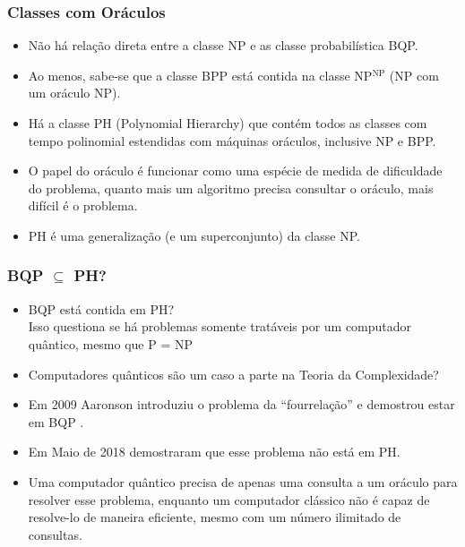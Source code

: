 \documentclass{beamer}
\begin{document}
\begin{frame}
\frametitle{Classes com Oráculos} 
\begin{itemize}
  \item Não há relação direta entre a classe NP e
  as classe probabilística BQP.
  \item Ao menos, sabe-se que a classe BPP está contida na classe
  NP$^{\text{NP}}$ (NP com um oráculo NP).
  \item Há a classe PH (Polynomial Hierarchy) que contém todos as
  classes com tempo polinomial estendidas com máquinas oráculos,
  inclusive NP e BPP.
  \item O papel do oráculo é funcionar como uma espécie de
  medida de dificuldade do problema, quanto mais um algoritmo precisa
  consultar o oráculo, mais difícil é o problema.
  \item PH é uma generalização (e um superconjunto) da classe NP. 
\end{itemize}
\end{frame}

\begin{frame}
\frametitle{BQP $\subseteq$ PH?} 
\begin{itemize}
  \item BQP está contida em PH?\\
   Isso questiona se há problemas somente tratáveis por um
   computador quântico, mesmo que P = NP
  \item Computadores quânticos são um caso a parte na Teoria da
   Complexidade?
  \item Em 2009 Aaronson introduziu o problema da ``fourrelação'' e
   demostrou estar em BQP \cite{aa:09}.
  \item Em Maio de 2018 \cite{ra:18} demostraram que esse problema não
   está em PH.
  \item Uma computador quântico precisa de apenas uma consulta a um
   oráculo para resolver esse problema, enquanto um computador
   clássico não é capaz de resolve-lo de maneira eficiente, mesmo com
   um número ilimitado de consultas.
\end{itemize}
\end{frame}
\end{document}
